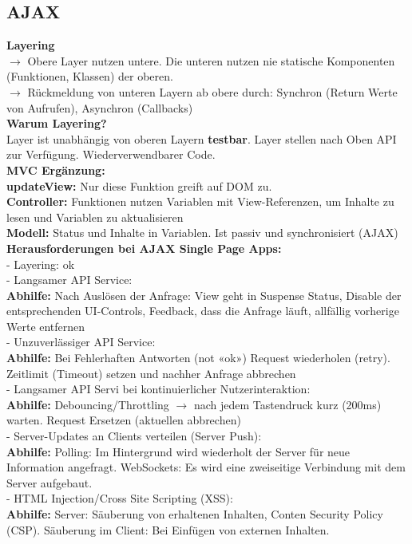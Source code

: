 \documentclass[7pt,landscape,a4paper]{scrartcl}
\begin{document}
\begin{multicols*}{4}
\section{AJAX}
	\textcolor{b}{\textbf{Layering}}\\
	$\rightarrow$ Obere Layer nutzen untere. Die unteren nutzen nie statische Komponenten (Funktionen, Klassen) der oberen.\\
	$\rightarrow$ Rückmeldung von unteren Layern ab obere durch: \textcolor{b}{Synchron} (Return Werte von Aufrufen), \textcolor{b}{Asynchron} (Callbacks)\\
	\textcolor{b}{\textbf{Warum Layering?}}\\
	Layer ist unabhängig von oberen Layern \textbf{testbar}. Layer stellen nach Oben API zur Verfügung. Wiederverwendbarer Code.\\
	\textcolor{b}{\textbf{MVC Ergänzung:}}\\
	\textbf{updateView:} Nur diese Funktion greift auf DOM zu.\\
	\textbf{Controller:} Funktionen nutzen Variablen mit View-Referenzen, um Inhalte zu lesen und Variablen zu aktualisieren\\
	\textbf{Modell:} Status und Inhalte in Variablen. Ist passiv und synchronisiert (AJAX)\\
	\textcolor{b}{\textbf{Herausforderungen bei AJAX Single Page Apps:}}\\
	\textcolor{b}{- Layering:} ok\\
	\textcolor{b}{- Langsamer API Service:}\\
	\textbf{Abhilfe:} Nach Auslösen der Anfrage: View geht in \textcolor{b}{Suspense Status}, \textcolor{b}{Disable} der entsprechenden UI-Controls, \textcolor{b}{Feedback}, dass die Anfrage läuft, allfällig vorherige Werte entfernen\\
	\textcolor{b}{- Unzuverlässiger API Service:}\\
	\textbf{Abhilfe:} Bei Fehlerhaften Antworten (not «ok»)	\textcolor{b}{Request wiederholen} (retry). \textcolor{b}{Zeitlimit} (Timeout) setzen und nachher Anfrage abbrechen\\
	\textcolor{b}{- Langsamer API Servi bei kontinuierlicher Nutzerinteraktion:}\\
	\textbf{Abhilfe:} \textcolor{b}{Debouncing/Throttling} $\rightarrow$ nach jedem Tastendruck kurz (200ms) warten. Request \textcolor{b}{Ersetzen} (aktuellen abbrechen)\\
	\textcolor{b}{- Server-Updates an Clients verteilen (Server Push):}\\
	\textbf{Abhilfe:} \textcolor{b}{Polling:} Im Hintergrund wird wiederholt der Server für neue Information angefragt. \textcolor{b}{WebSockets:} Es wird eine zweiseitige Verbindung mit dem Server aufgebaut.\\
	\textcolor{b}{- HTML Injection/Cross Site Scripting (XSS):}\\
	\textbf{Abhilfe:} \textcolor{b}{Server:} Säuberung von erhaltenen Inhalten, Conten Security Policy (CSP). \textcolor{b}{Säuberung im Client:} Bei Einfügen von externen Inhalten.

\end{multicols*}
\end{document}
